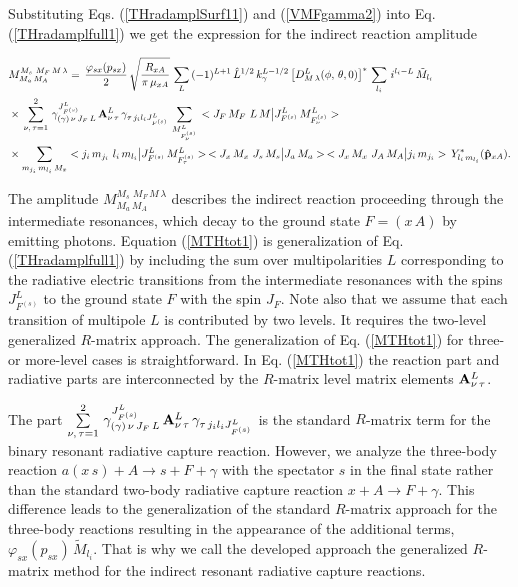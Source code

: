 \documentclass[prl,unsortedaddress,groupedaddress,twocolumn,amsmath,amsfonts,amssymb,showpacs,floatfix,nofootinbib]{revtex4}
\begin{document}
Substituting Eqs. (\ref{THradamplSurf11}) and (\ref{VMFgamma2})  into Eq.  (\ref{THradamplfull1}) we get  the expression for the indirect  reaction amplitude
\begin{widetext}
\begin{align}
&M_{M_{a}\,M_{A}}^{M_{s}\,\,M_{F}\,M\,\lambda} = \,\frac{\varphi_{sx}(p_{sx})}{2}\,\sqrt{\frac{R_{xA}}{\pi\,\mu_{xA}}}\,\sum\limits_{L}\,(-1)^{L+1}\,{\hat L}^{1/2}\,k_{\gamma}^{L-1/2}\,\big[D^{L}_{M\,\lambda}(\phi,\,\theta,0)\big]^{*}\,\sum\limits_{l_{i}}\,i^{l_{i} -L}\,{\tilde M}_{l_{i}} \nonumber\\
& \times\,  \sum\limits_{\nu,\,\tau=1}^{2}\,\gamma_{(\gamma)\,\nu\,J_{F}\,L}^{J_{F^{(s)}}^{L}}\,{\rm {\bf A}}_{\nu\,\tau}^{L} \,\gamma_{\tau\,j_{i}l_{i}J_{F^{(s)}}^{L}}\,\sum\limits_{ M_{F_{\nu}^{(s)}}^{L} }\, <J_{F}\,M_{F}\,\,L\,M \big|J_{F^{(s)}}^{L}\,M_{F_{\nu}^{(s)}}^{L}>                                                           \nonumber\\
& \times  \sum\limits_{m_{j_{i}}\,m_{l_{i}}\,M_{x} }<j_{i}\,m_{j_{i}}\,\,l_{i}\,m_{l_{i}}\big| J_{F^{(s)}}^{L}\,M_{F_{\tau}^{(s)}}^{L}>\, <J_{x}\,M_{x}\,\,J_{s}\,M_{s} \big|J_{a}\,M_{a}>\,<J_{x}\,M_{x}\,\,J_{A}\,M_{A} \big| j_{i}\,m_{j_{i}}>\,Y_{l_{i}\,m_{l_{i}}}^{*} ({\rm {\bf {\hat p}}}_{xA}).
\label{MTHtot1}
\end{align}
\end{widetext}

The amplitude $M_{M_{a}\,M_{A}}^{M_{s}\,\,M_{F}\,M\,\lambda}$  describes the indirect reaction proceeding through the intermediate resonances, which decay to the ground state $F=(x\,A)$ by emitting  photons. Equation (\ref{MTHtot1}) is generalization of Eq. (\ref{THradamplfull1})
by including the sum over multipolarities $L$ corresponding to the radiative electric transitions from the intermediate resonances with the spins $J_{F^{(s)}}^{L}$ to the ground state $F$ with the spin $J_{F}$. Note also that we assume that each transition of multipole $L$ is contributed by two levels. It requires the two-level generalized $R$-matrix approach. 
The generalization of Eq. (\ref{MTHtot1}) for three- or more-level cases is straightforward. 
In Eq. (\ref{MTHtot1}) the reaction part and radiative parts are interconnected by the $R$-matrix level matrix elements ${\rm {\bf A}}_{\nu\,\tau}^{L}$.  


The part $\sum\limits_{\nu,\,\tau=1}^{2}\,\gamma_{(\gamma)\,\nu\,J_{F}\,L}^{J_{F^{(s)}}^{L}}\,{\rm {\bf A}}_{\nu\,\tau}^{L} \,\gamma_{\tau\,j_{i}l_{i}J_{F^{(s)}}^{L}}$ is the standard $R$-matrix term for the binary resonant radiative capture reaction. However, we analyze the three-body reaction  $a(x\,s) + A \to s +F +\gamma$ with the spectator $s$ in the final state rather than the standard two-body radiative capture reaction $x +A \to F+ \gamma$. This difference leads to the 
generalization of the standard $R$-matrix approach for the three-body reactions resulting
in the appearance of the additional terms, $\varphi_{sx}(p_{sx})\,{\tilde M}_{l_{i}}$. That is why we call the developed approach the generalized $R$-matrix method for the indirect resonant radiative capture reactions. 
\end{document}
